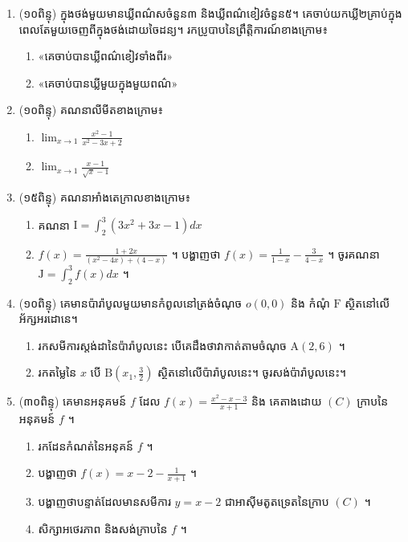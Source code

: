 \documentclass{officialexam}
\begin{document}
\newpage 
\maketitle 
    
    \begin{enumerate}[I]
\item (១០ពិន្ទុ) ក្នុងថង់មួយមានឃ្លីពណ៌សចំនួន៣ និងឃ្លីពណ៌ខៀវចំនួន៥។ គេចាប់យកឃ្លី២គ្រាប់ក្នុងពេលតែមួយចេញពីក្នុងថង់ដោយចៃដន្យ។
 រកប្រូបាបនៃព្រឹត្តិការណ៍ខាងក្រោម៖
\begin{enumerate}[k]
\item «គេចាប់បានឃ្លីពណ៌ខៀវទាំងពីរ»
\item «គេចាប់បានឃ្លីមួយក្នុងមួយពណ៌»
\end{enumerate}
\item (១០ពិន្ទុ)  គណនាលីមីតខាងក្រោម៖
			
						\begin{enumerate}[k,2]
						\item $\lim_{x\to 1}\frac{x^2-1}{x^2-3x+2}$
						\item  $\lim_{x\to 1}\frac{x-1}{\sqrt{x}-1}$
						\end{enumerate}
		
\item (១៥ពិន្ទុ)  គណនាអាំងតេក្រាលខាងក្រោម៖
		\begin{enumerate}[k]
		\item គណនា $\mathrm{I}=\int_2^3\left(3x^2+3x-1\right)dx$
		\item $f(x)=\frac{1+2x}{\left(x^2-4x\right)+(4-x)}$ ។ បង្ហាញថា $f(x)=\frac{1}{1-x}-\frac{3}{4-x}$ ។ 
 ចូរគណនា $\mathrm{J}=\int_2^3f(x)dx$ ។
		\end{enumerate}
\item (១០ពិន្ទុ)  គេមានប៉ារ៉ាបូលមួយមានកំពូលនៅត្រង់ចំណុច $o(0,0)$ និង កំណុំ $\mathrm{F}$ ស្ថិតនៅលើអ័ក្សអរដោនេ។
				\begin{enumerate}[k]
				\item រកសមីការស្តង់ដានៃប៉ារ៉ាបូលនេះ បើគេដឹងថាវាកាត់តាមចំណុច $\mathrm{A}(2,6)$ ។
				\item រកតម្លៃនៃ $x$ បើ $\mathrm{B}\left(x_1,\frac{3}{2}\right)$   ស្ថិតនៅលើប៉ារ៉ាបូលនេះ។ ចូរសង់ប៉ារ៉ាបូលនេះ។
				\end{enumerate}
\item (៣០ពិន្ទុ) គេមានអនុគមន៍ $f$ ដែល $f(x)=\frac{x^2-x-3}{x+1}$  និង គេតាងដោយ $(C)$  ក្រាបនៃអនុគមន៍ $f$ ។
			\begin{enumerate}[k]
			\item រកដែនកំណត់នៃអនុគន៍ $f$ ។
			\item បង្ហាញថា  $f(x)=x-2-\frac{1}{x+1}$ ។
			\item បង្ហាញថាបន្ទាត់ដែលមានសមីការ  $y=x-2$ ជាអាស៊ីមតូតទ្រេតនៃក្រាប $(C)$ ។
			\item សិក្សាអថេរភាព និងសង់ក្រាបនៃ $f$ ។
			\end{enumerate}
\end{enumerate}
\end{document}
